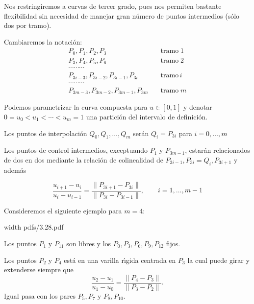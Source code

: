 \documentclass[twoside]{report}
\newcommand{\colocapdf}[2]{\quad\pdfimage width #2 {pdfs/#1.pdf}}
\begin{document}
\vspace{0.2cm}

Nos restringiremos a curvas de tercer grado, pues nos permiten bastante flexibilidad sin necesidad de manejar gran n\'{u}mero de puntos intermedios (s\'{o}lo dos por tramo).

\vspace{0.2cm}

Cambiaremos la notaci\'{o}n:
$$\begin{array}{ll} P_0,P_1,P_2,P_3& \quad \mbox{tramo}\; 1\\P_3,P_4,P_5,P_6&\quad \mbox{tramo}\; 2\\ \cdots \cdots \cdots & \\ P_{3i-3},P_{3i-2},P_{3i-1},P_{3i} & \quad \mbox{tramo}\, i\\  \cdots \cdots \cdots & \\ P_{3m-3},P_{3m-2},P_{3m-1},P_{3m} & \quad \mbox{tramo}\; m \end{array}$$

\vspace{0.2cm}

Podemos parametrizar la curva compuesta para $u\in [0,1]$ y denotar $0=u_0<u_1< \cdots<u_m=1$ una partici\'{o}n del intervalo de definici\'{o}n.

\vspace{0.2cm}

Los puntos de interpolaci\'{o}n $Q_0,Q_1,\ldots,Q_m$ ser\'{a}n $Q_i=P_{3i}$ para $i=0,\ldots,m$

Los puntos de control intermedios, exceptuando $P_1$ y $P_{3m-1}$, estar\'{a}n relacionados de dos en dos mediante la relaci\'{o}n de colinealidad de $P_{3i-1},P_{3i}=Q_i, P_{3i+1}$ y adem\'{a}s

$$\frac{u_{i+1}-u_i}{u_i-u_{i-1}}= \frac{\parallel P_{3i+1}-P_{3i}\parallel}{\parallel P_{3i}-P_{3i-1} \parallel},\quad \quad i=1,\ldots,m-1$$

\vspace{0.2cm}

Consideremos el siguiente ejemplo para $m=4$:

\vspace{0.2cm}

\begin{minipage}{.4\textwidth}\colocapdf{3.28}{\textwidth}
\end{minipage} \quad \quad
\begin{minipage}{.55\textwidth}
Los puntos $P_1$ y $P_{11}$ son libres y los $P_0,P_3,P_6,P_9,P_{12}$ fijos.

Los puntos $P_2$ y $P_4$ est\'{a} en una varilla r\'{\i}gida centrada en $P_3$ la cual puede girar y extenderse siempre que
$$\frac{u_2-u_1}{u_1-u_0}= \frac{\parallel P_4-P_3\parallel}{\parallel P_3-P_2 \parallel}.$$
Igual pasa con los pares $P_5,P_7$ y $P_8,P_{10}$.
\end{minipage}
\end{document}
